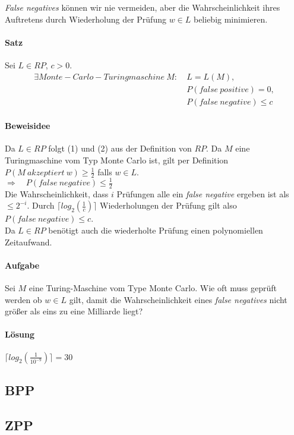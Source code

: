 \emph{False negatives} können wir nie vermeiden, aber die Wahrscheinlichkeit ihres Auftretens durch Wiederholung der Prüfung $w \in L$ beliebig minimieren.

\paragraph{Satz}
Sei $L \in RP$, $c > 0$.
\setcounter{equation}{0}
\begin{alignat}
	\exists Monte-Carlo-Turingmaschine\ M:\ 
	& L = L(M), \\
	& P(false\ positive) = 0, \\
	& P(false\ negative) \leq c
\end{alignat}

\paragraph{Beweisidee}
Da $L \in RP$ folgt (1) und (2) aus der Definition von $RP$.
Da $M$ eine Turingmaschine vom Typ Monte Carlo ist, gilt per Definition $P(M\ akzeptiert\ w) \geq \frac{1}{2}$ falls $w \in L$. \\
$\Rightarrow \quad P(false\ negative) \leq \frac{1}{2}$ \\
Die Wahrscheinlichkeit, dass $i$ Prüfungen alle ein \emph{false negative} ergeben ist als $\leq 2^{-i}$. 
Durch $\lceil log_{2}(\frac{1}{c}) \rceil$ Wiederholungen der Prüfung gilt also $P(false\ negative) \leq c$. \\
Da $L \in RP$ benötigt auch die wiederholte Prüfung einen polynomiellen Zeitaufwand.

\paragraph{Aufgabe}
Sei $M$ eine Turing-Maschine vom Type Monte Carlo. Wie oft muss geprüft werden ob $w \in L$ gilt, damit die Wahrscheinlichkeit eines \emph{false negatives} nicht größer als eins zu eine Milliarde liegt?

\paragraph{Lösung}
$\lceil log_{2}(\frac{1}{10^{-9}}) \rceil = 30$

\subsection{BPP}


\subsection{ZPP}